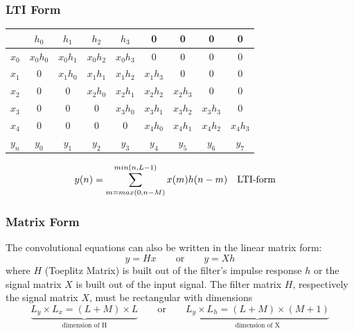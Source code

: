 \subsubsection{LTI Form}
\begin{tabular}{c|c:c:c:c:c:c:c:c|}
	& $h_0$ & $h_1$ & $h_2$ & $h_3$ & 0 & 0 & 0 & 0 \\
	\hline
	$x_0$ & $x_0h_0$ & $x_0h_1$ & $x_0h_2$ & $x_0h_3$ & 0 & 0 & 0 & 0 \\
	$x_1$ & 0 & $x_1h_0$ & $x_1h_1$ & $x_1h_2$ & $x_1h_3$ & 0 & 0 & 0 \\
	$x_2$ & 0 & 0 & $x_2h_0$ & $x_2h_1$ & $x_2h_2$ & $x_2h_3$ & 0 & 0 \\
	$x_3$ & 0 & 0 & 0 & $x_3h_0$ & $x_3h_1$ & $x_3h_2$ & $x_3h_3$ & 0 \\
	$x_4$ & 0 & 0 & 0 & 0 & $x_4h_0$ & $x_4h_1$ & $x_4h_2$ & $x_4h_3$ \\
	\hline
	$y_n$ & $y_0$ & $y_1$ & $y_2$ & $y_3$ & $y_4$ & $y_5$ & $y_6$ & $y_7$ \\
\end{tabular}
\begin{align}
& y(n) = \sum\limits_{m=max(0,n-M)}^{min(n,L-1)} x(m)h(n-m) && \text{LTI-form}\notag
\end{align}

\newpage

\subsubsection{Matrix Form}
The convolutional equations can also be written in the linear matrix form:
\[
	y = H  x	\qquad \text{or} \qquad y = Xh
\]
where $H$ (Toeplitz Matrix) is built out of the filter's impulse response $h$ or the signal matrix $X$ is built 
out of the input signal. The filter matrix $H$, respectively the signal matrix $X$, must be rectangular with dimensions
\[
	\underbrace{L_y \times L_x = (L + M)\times L}_{\text{dimension of H}} \qquad \text{or} \qquad
	\underbrace{L_y \times L_h = (L + M)\times (M + 1)}_{\text{dimension of X}}
\]

